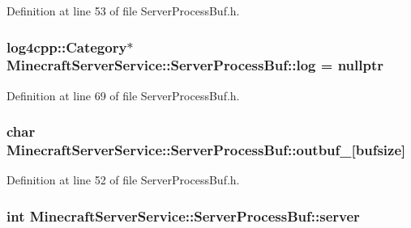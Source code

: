 Definition at line 53 of file Server\+Process\+Buf.\+h.

\subsubsection[{\texorpdfstring{log}{log}}]{\setlength{\rightskip}{0pt plus 5cm}log4cpp\+::\+Category$\ast$ Minecraft\+Server\+Service\+::\+Server\+Process\+Buf\+::log = nullptr\hspace{0.3cm}{\ttfamily [private]}}\hypertarget{class_minecraft_server_service_1_1_server_process_buf_a56d2de15cde0e925e8bed6880a5025d5}{}\label{class_minecraft_server_service_1_1_server_process_buf_a56d2de15cde0e925e8bed6880a5025d5}


Definition at line 69 of file Server\+Process\+Buf.\+h.

\subsubsection[{\texorpdfstring{outbuf\+\_\+}{outbuf_}}]{\setlength{\rightskip}{0pt plus 5cm}char Minecraft\+Server\+Service\+::\+Server\+Process\+Buf\+::outbuf\+\_\+\mbox{[}{\bf bufsize}\mbox{]}\hspace{0.3cm}{\ttfamily [private]}}\hypertarget{class_minecraft_server_service_1_1_server_process_buf_a820751b906ffa5a37c0482f6fcd5f48d}{}\label{class_minecraft_server_service_1_1_server_process_buf_a820751b906ffa5a37c0482f6fcd5f48d}


Definition at line 52 of file Server\+Process\+Buf.\+h.

\subsubsection[{\texorpdfstring{server}{server}}]{\setlength{\rightskip}{0pt plus 5cm}int Minecraft\+Server\+Service\+::\+Server\+Process\+Buf\+::server\hspace{0.3cm}{\ttfamily [private]}}\hypertarget{class_minecraft_server_service_1_1_server_process_buf_acfea7246743c17f4baaef24cf4a33c2f}{}\label{class_minecraft_server_service_1_1_server_process_buf_acfea7246743c17f4baaef24cf4a33c2f}


